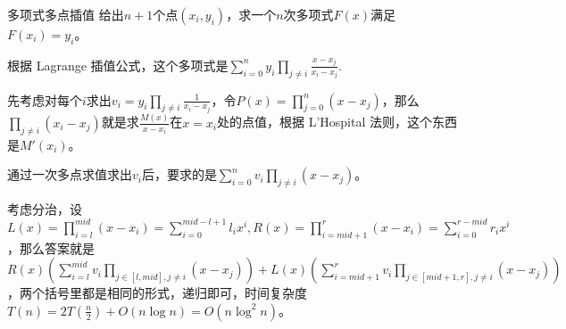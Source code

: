 \documentclass{beamer}
\begin{document}
	\begin{frame}{多项式多点插值}
		给出$n+1$个点$(x_i,y_i)$，求一个$n$次多项式$F(x)$满足$F(x_i)=y_i$。
		
		根据 Lagrange 插值公式，这个多项式是$\sum\limits_{i=0}^ny_i\prod\limits_{j\neq i}\frac{x-x_j}{x_i-x_j}$.
		
		先考虑对每个$i$求出$v_i=y_i\prod\limits_{j\neq i}\frac{1}{x_i-x_j}$，令$P(x)=\prod\limits_{j=0}^n(x-x_j)$，那么$\prod\limits_{j\neq i}(x_i-x_j)$就是求$\frac{M(x)}{x-x_i}$在$x=x_i$处的点值，根据 L'Hospital 法则，这个东西是$M'(x_i)$。
		
		通过一次多点求值求出$v_i$后，要求的是$\sum\limits_{i=0}^nv_i\prod\limits_{j\neq i}(x-x_j)$。
		
		考虑分治，设$L(x)=\prod\limits_{i=l}^{mid}(x-x_i)=\sum\limits_{i=0}^{mid-l+1}l_ix^i,R(x)=\prod\limits_{i=mid+1}^{r}(x-x_i)=\sum\limits_{i=0}^{r-mid}r_ix^i$，那么答案就是$R(x)\left(\sum\limits_{i=l}^{mid}v_i\prod\limits_{j\in[l,mid],j\neq i}(x-x_j)\right)+L(x)\left(\sum\limits_{i=mid+1}^rv_i\prod\limits_{j\in[mid+1,r],j\neq i}(x-x_j)\right)$，两个括号里都是相同的形式，递归即可，时间复杂度$T(n)=2T(\frac n2)+O(n\log n)=O(n\log^2n)$。
	\end{frame}
\end{document}
